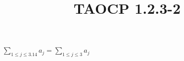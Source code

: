 \documentclass{article}
\title{TAOCP 1.2.3\mbox{-}2}
\begin{document}
\maketitle

\( \sum_{1 \leq j \leq 3.14} a_{j} = \sum_{1 \leq j \leq 3} a_{j} \)
\end{document}
